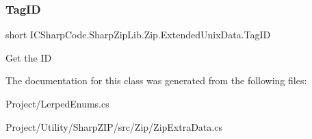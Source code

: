 \subsubsection{\texorpdfstring{Tag\+ID}{TagID}}
{\footnotesize\ttfamily short I\+C\+Sharp\+Code.\+Sharp\+Zip\+Lib.\+Zip.\+Extended\+Unix\+Data.\+Tag\+ID\hspace{0.3cm}{\ttfamily [get]}}



Get the ID 



The documentation for this class was generated from the following files\+:\begin{DoxyCompactItemize}
\item 
Project/Lerped\+Enums.\+cs\item 
Project/\+Utility/\+Sharp\+Z\+I\+P/src/\+Zip/Zip\+Extra\+Data.\+cs\end{DoxyCompactItemize}
